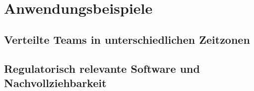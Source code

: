 \pagebreak

\chapter{Anwendungsbeispiele}
\section{Verteilte Teams in unterschiedlichen Zeitzonen}
\section{Regulatorisch relevante Software und Nachvollziehbarkeit}
